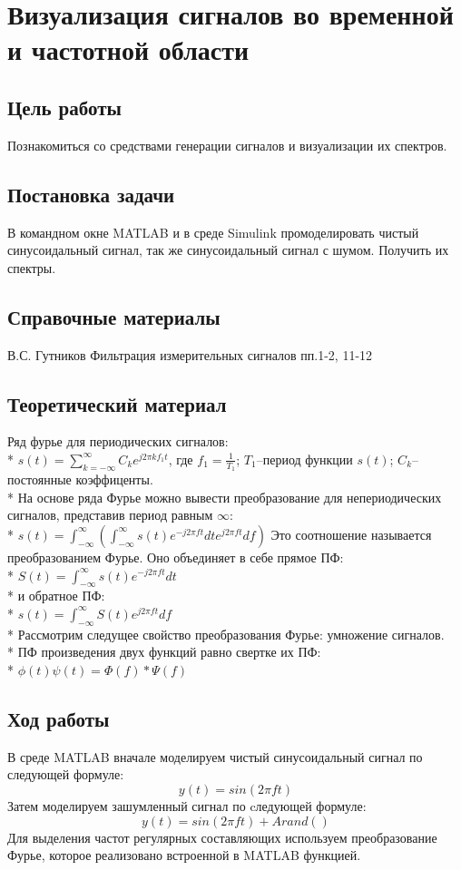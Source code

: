 \documentclass[10pt,a4paper]{article}
\begin{document}
\section{Визуализация сигналов во временной и частотной области}
\subsection{Цель работы}
Познакомиться со средствами генерации сигналов и визуализации их спектров.
\subsection{Постановка задачи}
В командном окне MATLAB и в среде Simulink промоделировать чистый синусоидальный сигнал, так же синусоидальный сигнал с шумом. Получить их спектры.
\subsection{Справочные материалы}
В.С. Гутников Фильтрация измерительных сигналов пп.1-2, 11-12
\subsection{Теоретический материал}
Ряд фурье для периодических сигналов:\\*
$s(t)=\sum_{k=-\infty}^{\infty}C_{k}e^{j2{\pi}kf_{1}t}$, где $f_{1}=\frac{1}{T_{1}}$; $T_{1}$--период функции $s(t)$; $C_{k}$--постоянные коэффиценты.\\*
На основе ряда Фурье можно вывести преобразование для непериодических сигналов, представив период равным $\infty$:\\*
$s(t)=\int_{-\infty}^{\infty}(\int_{-\infty}^{\infty}s(t)e^{-j2{\pi}ft}dte^{j2{\pi}ft}df)$
Это соотношение называется преобразованием Фурье. Оно объединяет в себе прямое ПФ:\\*
$S(t)=\int_{-\infty}^{\infty}s(t)e^{-j2{\pi}ft}dt$\\*
и обратное ПФ:\\*
$s(t)=\int_{-\infty}^{\infty}S(t)e^{j2{\pi}ft}df$\\*
Рассмотрим следущее свойство преобразования Фурье: умножение сигналов.\\*
ПФ произведения двух функций равно свертке их ПФ:\\*
$\phi(t)\psi(t)=\Phi(f)*\Psi(f)$
\subsection{Ход работы}
В среде MATLAB вначале моделируем чистый синусоидальный сигнал по следующей формуле:
\begin{displaymath}
y(t) = sin(2\pi ft)
\end{displaymath}
Затем моделируем зашумленный сигнал по cледующей формуле:
\begin{displaymath}
y(t) = sin(2\pi ft) + A rand()
\end{displaymath}
Для выделения частот регулярных составляющих используем преобразование Фурье, которое реализовано встроенной в MATLAB функцией.
\end{document}
